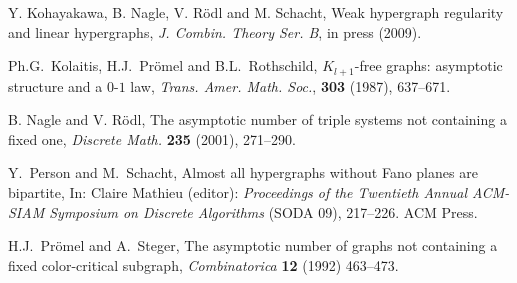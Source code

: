\documentclass[11pt]{article}
\begin{document}
\begin{thebibliography}{99}
Y. Kohayakawa, B. Nagle, V. R\"odl and M. Schacht, Weak hypergraph regularity and linear hypergraphs, {\em J. Combin. Theory Ser. B}, in press (2009).

 Ph.G.~Kolaitis, H.J.~Pr\"omel and B.L.~Rothschild, $K_{l+1}$-free graphs:
asymptotic structure and a $0$-$1$ law, {\em Trans. Amer. Math.
Soc.},  {\bf 303} (1987), 637--671.


 B. Nagle and V. R\"odl, The asymptotic number of triple systems not containing a fixed one,
 {\em Discrete Math.} {\bf 235} (2001), 271--290.

 Y.~Person and M.~Schacht, Almost all hypergraphs without Fano planes are bipartite,
In: Claire Mathieu (editor): {\em Proceedings of the Twentieth Annual ACM-SIAM Symposium on Discrete Algorithms}
 (SODA 09), 217--226. ACM Press.

 H.J.~Pr\"omel and A.~Steger, The asymptotic number of graphs
not containing a fixed color-critical subgraph,
  {\em Combinatorica}  {\bf 12} (1992) 463--473.
\end{thebibliography}
\end{document}
